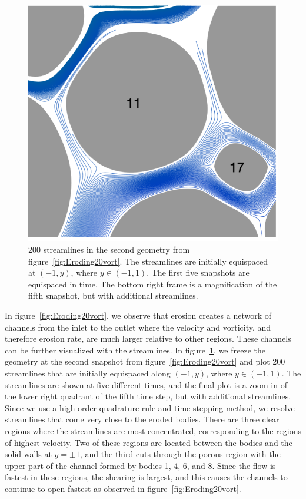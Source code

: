 \documentclass{jfm}
\begin{document}
\begin{figure}
\begin{center}
\includegraphics[width = 0.32 \textwidth]{./figs/tracer_20b270n_zoom}
\caption{\label{fig:Eroding20tracer} 200 streamlines in the second
geometry from figure~\ref{fig:Eroding20vort}. The streamlines are
initially equispaced at $(-1,y)$, where $y \in (-1,1)$. The first five
snapshots are equispaced in time.  The bottom right frame is a
magnification of the fifth snapshot, but with additional streamlines.}
\end{center}
\end{figure}


In figure~\ref{fig:Eroding20vort}, we observe that erosion creates a
network of channels from the inlet to the outlet where the velocity and
vorticity, and therefore erosion rate, are much larger relative to other
regions.  These channels can be further visualized  with the
streamlines.  In figure~\ref{fig:Eroding20tracer}, we freeze the
geometry at the second snapshot from figure~\ref{fig:Eroding20vort} and
plot 200 streamlines that are initially equispaced along $(-1,y)$, where
$y \in (-1,1)$.  The streamlines are shown at five different times, and
the final plot is a zoom in of the lower right quadrant of the fifth
time step, but with additional streamlines.  Since we use a high-order
quadrature rule and time stepping method, we resolve streamlines that
come very close to the eroded bodies.  There are three clear regions
where the streamlines are most concentrated, corresponding to the
regions of highest velocity.  Two of these regions are located between
the bodies and the solid walls at $y=\pm 1$, and the third cuts through
the porous region with the upper part of the channel formed by bodies 1,
4, 6, and 8.  Since the flow is fastest in these regions, the shearing
is largest, and this causes the channels to continue to open fastest as
observed in figure~\ref{fig:Eroding20vort}.
\end{document}
